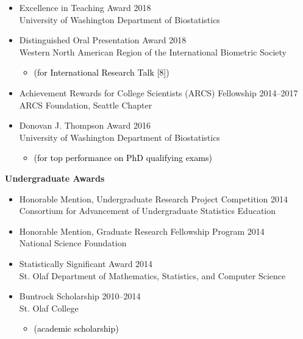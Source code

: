 \documentclass[margin]{res}
\newcommand{\annotateItem}[1]{
	\begin{itemize} \vspace{-0.1cm}
	\item[] 
	\begin{footnotesize}\textcolor{black}{(#1)}\end{footnotesize}
	\end{itemize} \vspace{-0.1cm}
}
\begin{document}
\begin{resume}
\begin{itemize}
\item Excellence in Teaching Award  \hfill 2018 \\
University of Washington Department of Biostatistics

\item Distinguished Oral Presentation Award  \hfill 2018 \\ Western North American Region of the International Biometric Society  %
	\annotateItem{for International Research Talk [8]}

\item Achievement Rewards for College Scientists (ARCS) Fellowship \hfill 2014--2017 \\
ARCS Foundation, Seattle Chapter

\item Donovan J. Thompson Award  \hfill 2016 \\
University of Washington Department of Biostatistics %
	\annotateItem{for top performance on PhD qualifying exams}

\end{itemize}


\textbf{Undergraduate Awards}
\begin{itemize}

\item Honorable Mention, Undergraduate Research Project Competition \hfill 2014  \\
Consortium for Advancement of Undergraduate Statistics Education

\item Honorable Mention, Graduate Research Fellowship Program  \hfill 2014 \\
National Science Foundation

\item Statistically Significant Award \hfill 2014 \\
St. Olaf Department of Mathematics, Statistics, and Computer Science 

\item Buntrock Scholarship \hfill 2010--2014 \\
St. Olaf College 
	\annotateItem{academic scholarship}


\end{itemize}
\end{resume}
\end{document}

